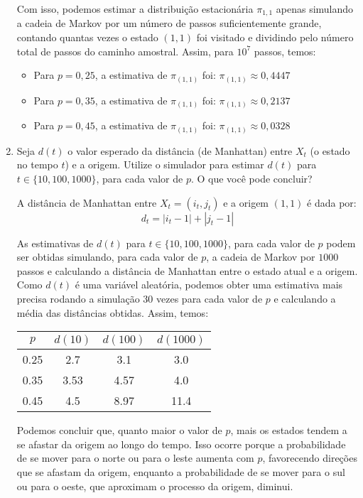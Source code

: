 \begin{enumerate}
\begin{resposta}
        Com isso, podemos estimar a distribuição estacionária $\pi_{1,1}$ apenas simulando a cadeia de Markov por um número de passos suficientemente grande, contando quantas vezes o estado $(1,1)$ foi visitado e dividindo pelo número total de passos do caminho amostral. Assim, para $10^7$ passos, temos:
        \begin{itemize}
            \item Para $p = 0{,}25$, a estimativa de $\pi_{(1,1)}$ foi:
            $ \pi_{(1,1)} \approx 0{,}4447 $
            
            \item Para $p = 0{,}35$, a estimativa de $\pi_{(1,1)}$ foi:
            $ \pi_{(1,1)} \approx 0{,}2137 $

            \item Para $p = 0{,}45$, a estimativa de $\pi_{(1,1)}$ foi:
            $ \pi_{(1,1)} \approx 0{,}0328 $
        \end{itemize}

    \end{resposta}
    \item Seja $d(t)$ o valor esperado da distância (de Manhattan) entre $X_t$ (o estado no tempo $t$) e a origem. Utilize o simulador para estimar $d(t)$ para $t \in \{10, 100, 1000\}$, para cada valor de $p$. O que você pode concluir?
    \begin{resposta}
        A distância de Manhattan entre $X_t=(i_t, j_t)$ e a origem $(1,1)$ é dada por:
        $$d_t = |i_t - 1| + |j_t - 1|$$

        As  estimativas de $d(t)$ para $t \in \{10, 100, 1000\}$, para cada valor de $p$ podem ser obtidas simulando, para cada valor de $p$, a cadeia de Markov por $1000$ passos e calculando a distância de Manhattan entre o estado atual e a origem. Como $d(t)$ é uma variável aleatória, podemos obter uma estimativa mais precisa rodando a simulação 30 vezes para cada valor de $p$ e calculando a média das distâncias obtidas. Assim, temos:

        \begin{center}
            \begin{tabular}{|c|c|c|c|}
            \hline
            $p$ & $d(10)$ & $d(100)$ & $d(1000)$ \\
            \hline
            0.25 & 2.7 & 3.1 & 3.0 \\
            0.35 & 3.53 & 4.57 & 4.0 \\
            0.45 & 4.5 & 8.97 & 11.4 \\
            \hline
        \end{tabular}
\end{center}

    Podemos concluir que, quanto maior o valor de $p$, mais os estados tendem a se afastar da origem ao longo do tempo. Isso ocorre porque a probabilidade de se mover para o norte ou para o leste aumenta com $p$, favorecendo direções que se afastam da origem, enquanto a probabilidade de se mover para o sul ou para o oeste, que aproximam o processo da origem, diminui.

    \end{resposta}
\end{enumerate}
